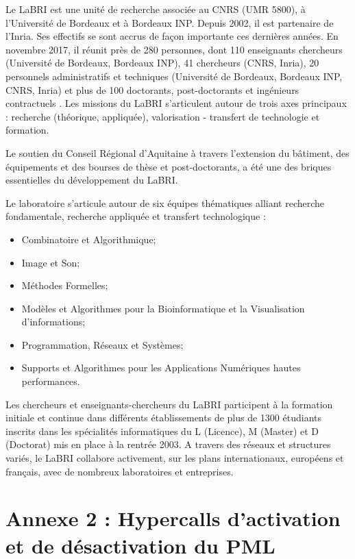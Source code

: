 \noindent Le LaBRI est une unité de recherche associée au CNRS (UMR 5800), à l'Université de Bordeaux et à Bordeaux INP. Depuis 2002, il est partenaire de l'Inria. Ses effectifs se sont accrus de façon importante ces dernières années. En novembre 2017, il réunit près de 280 personnes, dont 110 enseignants chercheurs (Université de Bordeaux, Bordeaux INP), 41 chercheurs (CNRS, Inria), 20 personnels administratifs et techniques (Université de Bordeaux, Bordeaux INP, CNRS, Inria) et plus de 100 doctorants, post-doctorants et ingénieurs contractuels . Les missions du LaBRI s'articulent autour de trois axes principaux : recherche (théorique, appliquée), valorisation - transfert de technologie et formation.

\noindent Le soutien du Conseil Régional d'Aquitaine à travers l'extension du bâtiment, des équipements et des bourses de thèse et post-doctorants, a été une des briques essentielles du développement du LaBRI.

\noindent Le laboratoire s'articule autour de six équipes thématiques alliant recherche fondamentale, recherche appliquée et transfert technologique : 
\begin{itemize}[label=]
    \item Combinatoire et Algorithmique;
    \item Image et Son;
    \item Méthodes Formelles;
    \item Modèles et Algorithmes pour la Bioinformatique et la Visualisation d'informations;
    \item Programmation, Réseaux et Systèmes;
    \item Supports et Algorithmes pour les Applications Numériques hautes performances.
\end{itemize}

\noindent Les chercheurs et enseignants-chercheurs du LaBRI participent à la formation initiale et continue dans différents établissements de plus de 1300 étudiants inscrits dans les spécialités informatiques du L (Licence), M (Master) et D (Doctorat) mis en place à la rentrée 2003. A travers des réseaux et structures variés, le LaBRI collabore activement, sur les plans internationaux, européens et français, avec de nombreux laboratoires et entreprises. 

\section*{Annexe 2 : Hypercalls d'activation et de désactivation du PML}
\label{section:enable_disable_logdirty}

